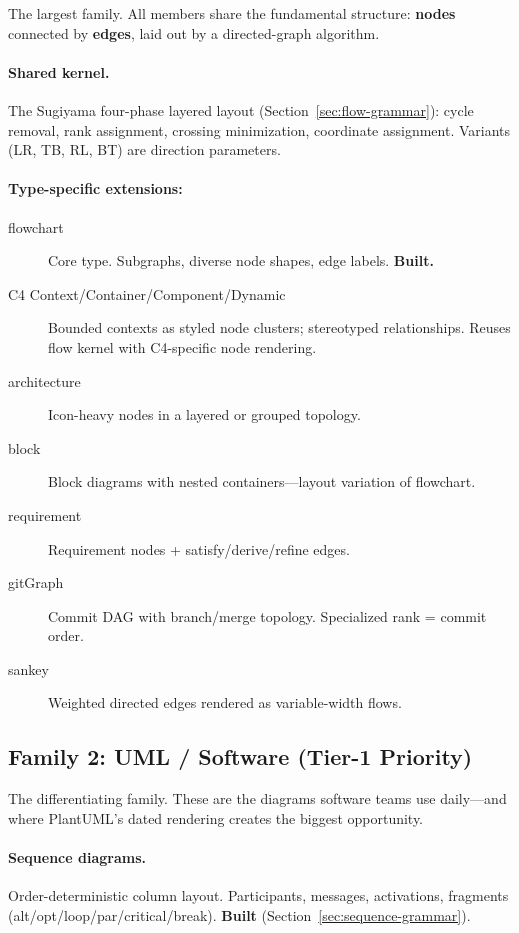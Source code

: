 The largest family. All members share the fundamental structure: \textbf{nodes} connected by
\textbf{edges}, laid out by a directed-graph algorithm.

\paragraph{Shared kernel.} The Sugiyama four-phase layered layout
(Section~\ref{sec:flow-grammar}): cycle removal, rank assignment, crossing minimization,
coordinate assignment. Variants (LR, TB, RL, BT) are direction parameters.

\paragraph{Type-specific extensions:}
\begin{description}
  \item[flowchart] Core type. Subgraphs, diverse node shapes, edge labels. \textbf{Built.}
  \item[C4 Context/Container/Component/Dynamic] Bounded contexts as styled node clusters;
        stereotyped relationships. Reuses flow kernel with C4-specific node rendering.
  \item[architecture] Icon-heavy nodes in a layered or grouped topology.
  \item[block] Block diagrams with nested containers---layout variation of flowchart.
  \item[requirement] Requirement nodes + satisfy/derive/refine edges.
  \item[gitGraph] Commit DAG with branch/merge topology. Specialized rank = commit order.
  \item[sankey] Weighted directed edges rendered as variable-width flows.
\end{description}

\subsection{Family 2: UML / Software (Tier-1 Priority)}
\label{sec:family-uml}

The differentiating family. These are the diagrams software teams use daily---and where
PlantUML's dated rendering creates the biggest opportunity.

\paragraph{Sequence diagrams.} Order-deterministic column layout. Participants, messages,
activations, fragments (alt/opt/loop/par/critical/break). \textbf{Built}
(Section~\ref{sec:sequence-grammar}).

